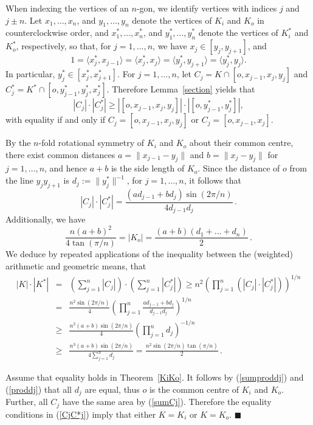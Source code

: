 \documentclass[12pt]{article}
\begin{document}
When indexing the vertices of an $n$-gon, we identify
vertices with indices $j$ and $j\pm n$.
Let $x_1,\ldots,x_n$, and $y_1,\ldots,y_n$ denote
the vertices of $K_i$ and $K_o$ in counterclockwise order, and
$x^*_1,\ldots,x^*_n$, and $y^*_1,\ldots,y^*_n$ denote
the vertices of $K_i^*$ and $K_o^*$, respectively, so
that, for $j=1,\ldots,n$, we have $x_j\in[y_j,y_{j+1}]$, and
$$
1=\langle x_j^*,x_{j-1}\rangle=\langle x_j^*,x_j\rangle
=\langle y_j^*,y_{j+1}\rangle=\langle y_j^*,y_j\rangle.
$$
In particular, $y_j^*\in[x_j^*,x_{j+1}^*]$.
For $j=1,\ldots,n$,
let $C_j=K\cap[o,x_{j-1},x_j,y_j]$ and
 $C_j^*=K^*\cap[o,y_{j-1}^*,y_j^*,x_j^*]$.
 Therefore Lemma~\ref{section} yields that
 \begin{equation}
 \label{CjC*j}
|C_j|\cdot |C_j^*|\geq |[o,x_{j-1},x_j,y_j]|\cdot
|[o,y_{j-1}^*,y_j^*]|,
 \end{equation}
 with equality if and only if $C_j=[o,x_{j-1},x_j,y_j]$
 or $C_j=[o,x_{j-1},x_j]$.

 By the $n$-fold rotational symmetry of $K_i$ and $K_o$
 about their common centre, there exist common distances
 $a=\|x_{j-1}-y_j\|$ and $b=\|x_j-y_j\|$ for $j=1,\ldots,n$,
 and hence $a+b$ is the side length of $K_o$.
 Since the distance
 of $o$ from the line $y_jy_{j+1}$ is
 $d_j:=\|y_j^*\|^{-1}$, for $j=1,\ldots,n$, it follows that
$$
|C_j|\cdot |C_j^*|=\frac{(ad_{j-1}+bd_j)\sin(2\pi/n)}{4d_{j-1}d_j}\,.
$$
Additionally, we have
$$
\frac{n(a+b)^2}{4\tan(\pi/n)}=|K_o|=\frac{(a+b)(d_1+\ldots+d_n)}2\,.
$$
We deduce by repeated applications of the inequality between
the (weighted) arithmetic and geometric means, that
\begin{eqnarray}
\label{sumCj}
|K|\cdot|K^*| &=&\left(\sum_{j=1}^n|C_j|\right) \cdot
\left(\sum_{j=1}^n|C_j^*|\right)
\geq n^2\left(\prod_{j=1}^n ( |C_j|\cdot |C_j^*| ) \right)^{1/n}\\
\nonumber
 &=& \frac{n^2\sin(2\pi/n)}4
 \left(\prod_{j=1}^n\frac{ad_{j-1}+bd_j}{d_{j-1}d_j}\right)^{1/n}  \\
 \label{sumproddj}
&\geq&
 \frac{n^2(a+b)\sin(2\pi/n)}{4}
 \left(\prod_{j=1}^n d_j\right)^{-1/n}\\
 \label{proddj}
 &\geq &\frac{n^3(a+b)\sin(2\pi/n)}{4\sum_{j=1}^n d_j}
=
 \frac{n^2\sin(2\pi/n)\tan(\pi/n)}{2}\,.
\end{eqnarray}

 Assume that equality holds in Theorem~\ref{KiKo}. It follows by
 (\ref{sumproddj}) and 
 (\ref{proddj}) that all $d_j$ are equal, thus $o$ is the
 common centre of $K_i$ and $K_o$. Further,
 all $C_j$ have the same area by (\ref{sumCj}).
 Therefore the equality conditions
 in (\ref{CjC*j}) imply that either $K=K_i$
 or $K=K_o$. 
$\blacksquare $
\end{document}
